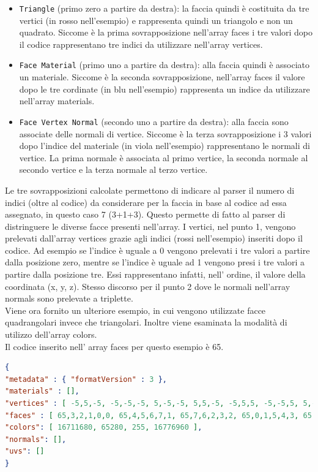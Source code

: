\begin{itemize}
\item \texttt{Triangle} (primo zero a partire da destra): la faccia quindi è costituita da tre vertici (in rosso nell'esempio) e rappresenta quindi un triangolo e non un quadrato. Siccome è la prima sovrapposizione nell’array faces i tre valori dopo il codice rappresentano tre indici da utilizzare nell’array vertices.
\item \texttt{Face Material} (primo uno a partire da destra): alla faccia quindi è associato un materiale. Siccome è la seconda sovrapposizione, nell’array faces il valore dopo le tre cordinate (in blu nell'esempio) rappresenta un indice da utilizzare nell’array materials.
\item \texttt{Face Vertex Normal} (secondo uno a partire da destra): alla faccia sono associate delle normali di vertice. Siccome è la terza sovrapposizione i 3 valori dopo l’indice del materiale (in viola nell'esempio) rappresentano le normali di vertice. La prima normale è associata al primo vertice, la seconda normale al secondo vertice e la terza normale al terzo vertice.
\end{itemize}

Le tre sovrapposizioni calcolate permettono di indicare al parser il numero di indici (oltre al codice) da considerare per la faccia in base al codice ad essa assegnato, in questo caso 7 (3+1+3). 
Questo permette di fatto al parser di distringuere le diverse facce presenti nell’array.
I vertici, nel punto 1, vengono prelevati dall’array vertices grazie agli indici (rossi nell’esempio) inseriti dopo il codice. Ad esempio se l’indice è uguale a 0 vengono prelevati i tre valori a partire dalla posizione zero, mentre se l’indice è uguale ad 1 vengono presi i tre valori a partire dalla posizione tre. Essi rappresentano infatti, nell’ ordine, il valore della coordinata (x, y, z).
Stesso discorso per il punto 2 dove le normali nell’array normals sono prelevate a triplette.
\\
Viene ora fornito un ulteriore esempio, in cui vengono utilizzate facce quadrangolari invece che triangolari. Inoltre viene esaminata la modalità di utilizzo dell’array colors.
\\
Il codice inserito nell' array faces per questo esempio è 65.

\begin{lstlisting}[language=json]
{ 
"metadata" : { "formatVersion" : 3 }, 
"materials" : [], 
"vertices" : [ -5,5,-5, -5,-5,-5, 5,-5,-5, 5,5,-5, -5,5,5, -5,-5,5, 5,-5,5, 5,5,5 ], 
"faces" : [ 65,3,2,1,0,0, 65,4,5,6,7,1, 65,7,6,2,3,2, 65,0,1,5,4,3, 65,0,4,7,3,0, 65,6,5,1,2,1 ], 
"colors": [ 16711680, 65280, 255, 16776960 ], 
"normals": [], 
"uvs": [] 
}
\end{lstlisting}

